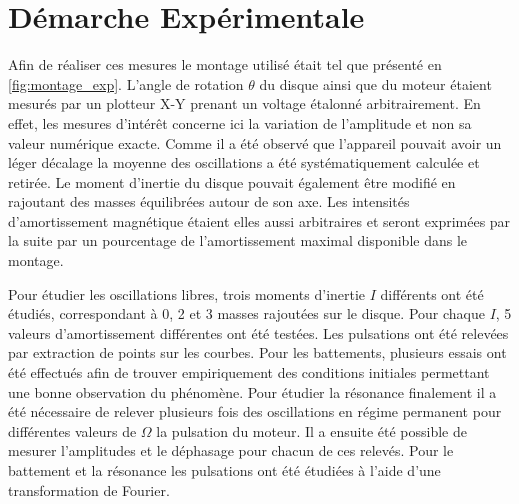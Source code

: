 \section{Démarche Expérimentale}
Afin de réaliser ces mesures le montage utilisé était tel que présenté en \autoref{fig:montage_exp}. L'angle de rotation $\theta$ du disque ainsi que du moteur étaient mesurés par un plotteur X-Y prenant un voltage étalonné arbitrairement. En effet, les mesures d'intérêt concerne ici la variation de l'amplitude et non sa valeur numérique exacte. Comme il a été observé que l'appareil pouvait avoir un léger décalage la moyenne des oscillations a été systématiquement calculée et retirée. Le moment d'inertie du disque pouvait également être modifié en rajoutant des masses équilibrées autour de son axe. Les intensités d'amortissement magnétique étaient elles aussi arbitraires et seront exprimées par la suite par un pourcentage de l'amortissement maximal disponible dans le montage.

Pour étudier les oscillations libres, trois moments d'inertie $I$ différents ont été étudiés, correspondant à 0, 2 et 3 masses rajoutées sur le disque. Pour chaque $I$, 5 valeurs d'amortissement différentes ont été testées. Les pulsations ont été relevées par extraction de points sur les courbes. Pour les battements, plusieurs essais ont été effectués afin de trouver empiriquement des conditions initiales permettant une bonne observation du phénomène. Pour étudier la résonance finalement il a été nécessaire de relever plusieurs fois des oscillations en régime permanent pour différentes valeurs de $\Omega$ la pulsation du moteur. Il a ensuite été possible de mesurer l'amplitudes et le déphasage pour chacun de ces relevés. Pour le battement et la résonance les pulsations ont été étudiées à l'aide d'une transformation de Fourier.